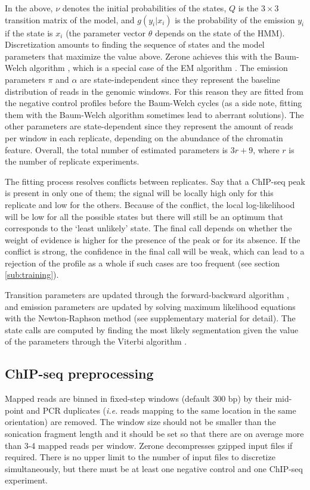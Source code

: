 \documentclass{bioinfo}
\begin{document}
\begin{methods}
In the above, $\nu$ denotes the initial probabilities of the states,
$Q$ is the $3 \times 3$ transition matrix of the model, and
$g(y_i|x_i)$ is the probability of the emission $y_i$ if the state is
$x_i$ (the parameter vector $\theta$ depends on the state of the HMM).
Discretization amounts to finding the sequence of states and the
model parameters that maximize the value above. Zerone achieves this
with the Baum-Welch algorithm \citep{baum1966}, which is a special case
of the EM algorithm \citep{Dempster77maximumlikelihood}. The emission
parameters $\pi$ and $\alpha$ are state-independent since they represent
the baseline distribution of reads in the genomic windows. For this
reason they are fitted from the negative control profiles before the
Baum-Welch cycles (as a side note, fitting them with the Baum-Welch
algorithm sometimes lead to aberrant solutions). The other parameters
are state-dependent since they represent the amount of reads per window
in each replicate, depending on the abundance of the chromatin feature.
Overall, the total number of estimated parameters is $3r+9$, where $r$
is the number of replicate experiments.

The fitting process resolves conflicts between replicates. Say that
a ChIP-seq peak is present in only one of them; the signal
will be locally high only for this replicate and low for the others.
Because of the conflict, the local log-likelihood will be low for
all the possible states but there will still be an optimum that
corresponds to the `least unlikely' state. The final call depends on
whether the weight of evidence is higher for the presence of the
peak or for its absence. If the conflict is strong, the confidence
in the final call will be weak, which can lead to a rejection of
the profile as a whole if such cases are too frequent
(see section \ref{sub:training}).

Transition parameters are updated through the forward-backward
algorithm \citep{18626}, and emission parameters are updated by solving
maximum likelihood equations with the Newton-Raphson method (see
supplementary material for detail). The state calls are computed by
finding the most likely segmentation given the value of the parameters
through the Viterbi algorithm \citep{1054010}.

\subsection{ChIP-seq preprocessing}
Mapped reads are binned in fixed-step windows (default 300
bp) by their mid-point and PCR duplicates (\textit{i.e.} reads mapping to
the same location in the same orientation) are removed. The window size
should not be smaller than the sonication fragment length and
it should be set so that there are on average more than 3-4 mapped reads
per window. Zerone decompresses gzipped input files if required. There is
no upper limit to the number of input files to discretize simultaneously,
but there must be at least one negative control and one ChIP-seq experiment.


\end{methods}
\end{document}
